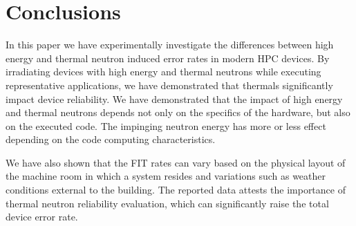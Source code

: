 \section{Conclusions}
\label{sec_conclusion}

In this paper we have experimentally investigate the differences between high
energy and thermal neutron induced error rates in modern HPC devices. %
By irradiating devices  with high energy and thermal neutrons while executing representative applications,  we have demonstrated that thermals significantly impact device reliability.
We have demonstrated that the impact of high energy and thermal neutrons depends not only on the specifics of the hardware, but also on the executed code. The impinging neutron energy has more or less effect depending on the code computing characteristics. 

We have also shown that the FIT rates can vary based on the physical layout of the machine room in which a system resides and variations such as weather conditions external to the building. 
%
The reported data attests the importance of thermal neutron reliability
evaluation, which can significantly raise the total device error rate. %
